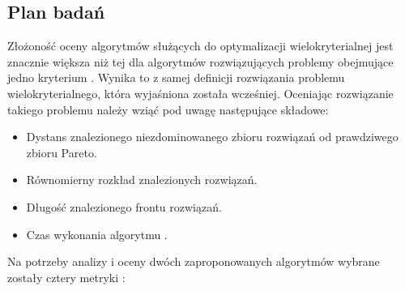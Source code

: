 \documentclass[twoside]{iisthesis}
\begin{document}
\subsection{Plan badań}
Złożoność oceny algorytmów służących do optymalizacji wielokryterialnej jest znacznie większa niż tej dla algorytmów rozwiązujących problemy obejmujące jedno kryterium \cite{comparison_deb}. Wynika to z samej definicji rozwiązania problemu wielokryterialnego, która wyjaśniona została wcześniej. Oceniając rozwiązanie takiego problemu należy wziąć pod uwagę następujące składowe:\\
\begin{itemize}
	\item Dystans znalezionego niezdominowanego zbioru rozwiązań od prawdziwego zbioru Pareto.
	\item Równomierny rozkład znalezionych rozwiązań.
	\item Długość znalezionego frontu rozwiązań.
	\item Czas wykonania algorytmu \cite{comparison_2}.\\
\end{itemize}
Na potrzeby analizy i oceny dwóch zaproponowanych algorytmów wybrane zostały cztery metryki \cite{comparison_deb}\cite{comparison_2}:\\
\end{document}
